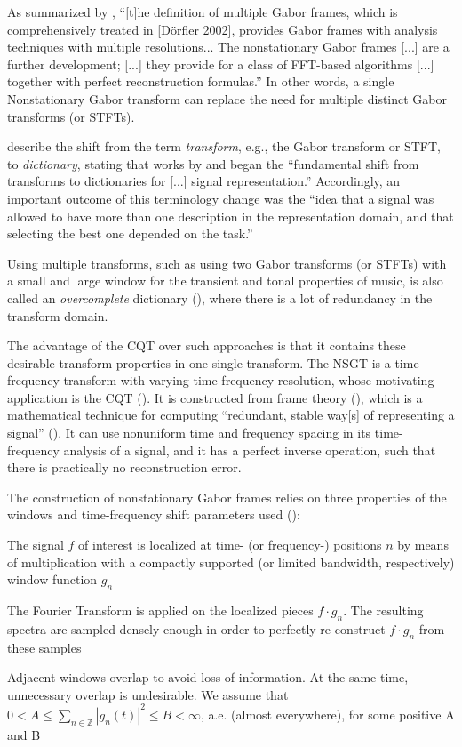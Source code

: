 \documentclass[report.tex]{subfiles}
\begin{document}
As summarized by \textcite{adaptivecqt}, ``[t]he definition of multiple Gabor frames, which is comprehensively treated in [D{\"o}rfler 2002], provides Gabor frames with analysis techniques with multiple resolutions... The nonstationary Gabor frames [...] are a further development; [...] they provide for a class of FFT-based algorithms [...] together with perfect reconstruction formulas.'' In other words, a single Nonstationary Gabor transform can replace the need for multiple distinct Gabor transforms (or STFTs).

\textcite{dictionary} describe the shift from the term \textit{transform}, e.g., the Gabor transform or STFT, to \textit{dictionary}, stating that works by \cite{dictionary1} and \cite{dictionary2} began the ``fundamental shift from transforms to dictionaries for [...] signal representation.'' Accordingly, an important outcome of this terminology change was the ``idea that a signal was allowed to have more than one description in the representation domain, and that selecting the best one depended on the task.''

Using multiple transforms, such as using two Gabor transforms (or STFTs) with a small and large window for the transient and tonal properties of music, is also called an \textit{overcomplete} dictionary (\cite{dictionary}), where there is a lot of redundancy in the transform domain.

The advantage of the CQT over such approaches is that it contains these desirable transform properties in one single transform. The NSGT is a time-frequency transform with varying time-frequency resolution, whose motivating application is the CQT (\cite{jaillet, balazs}). It is constructed from frame theory (\cite{frametheory}), which is a mathematical technique for computing ``redundant, stable way[s] of representing a signal'' (\cite{framesintro}). It can use nonuniform time and frequency spacing in its time-frequency analysis of a signal, and it has a perfect inverse operation, such that there is practically no reconstruction error.

The construction of nonstationary Gabor frames relies on three properties of the windows and time-frequency shift parameters used (\cite{balazs}):
\begin{tight_itemize}
	\item
		The signal $f$ of interest is localized at time- (or frequency-) positions $n$ by means of multiplication with a compactly supported (or limited bandwidth, respectively) window function $g_{n}$
	\item
		The Fourier Transform is applied on the localized pieces $f \cdot g_{n}$. The resulting spectra are sampled densely enough in order to perfectly re-construct $f \cdot g_{n}$ from these samples
	\item
		Adjacent windows overlap to avoid loss of information. At the same time, unnecessary overlap is undesirable. We assume that $0 < A \le \sum_{n \in \mathbb{Z}}|g_{n}(t)|^{2} \le B < \infty$, a.e. (almost everywhere), for some positive A and B
\end{tight_itemize}
\end{document}

